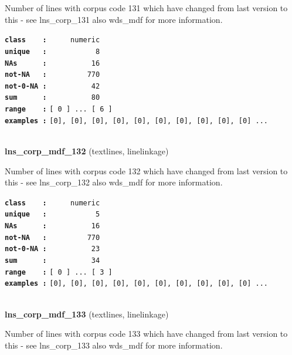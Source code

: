 \documentclass[]{article}
\begin{document}
Number of lines with corpus code 131 which have changed from last
version to this - see lns\_corp\_131 also wds\_mdf for more information.

\textbf{\texttt{class\ \ \ \ :}} \texttt{~~~~~numeric}\\
\textbf{\texttt{unique\ \ \ :}} \texttt{~~~~~~~~~~~8}\\
\textbf{\texttt{NAs\ \ \ \ \ \ :}} \texttt{~~~~~~~~~~16}\\
\textbf{\texttt{not-NA\ \ \ :}} \texttt{~~~~~~~~~770}\\
\textbf{\texttt{not-0-NA\ :}} \texttt{~~~~~~~~~~42}\\
\textbf{\texttt{sum\ \ \ \ \ \ :}} \texttt{~~~~~~~~~~80}\\
\textbf{\texttt{range\ \ \ \ :}}
\texttt{{[}\ 0\ {]}\ ...\ {[}\ 6\ {]}}\\
\textbf{\texttt{examples\ :}}
\texttt{{[}0{]},\ {[}0{]},\ {[}0{]},\ {[}0{]},\ {[}0{]},\ {[}0{]},\ {[}0{]},\ {[}0{]},\ {[}0{]},\ {[}0{]}\ ...}\\

~

\textbf{lns\_corp\_mdf\_132} (textlines, linelinkage)

Number of lines with corpus code 132 which have changed from last
version to this - see lns\_corp\_132 also wds\_mdf for more information.

\textbf{\texttt{class\ \ \ \ :}} \texttt{~~~~~numeric}\\
\textbf{\texttt{unique\ \ \ :}} \texttt{~~~~~~~~~~~5}\\
\textbf{\texttt{NAs\ \ \ \ \ \ :}} \texttt{~~~~~~~~~~16}\\
\textbf{\texttt{not-NA\ \ \ :}} \texttt{~~~~~~~~~770}\\
\textbf{\texttt{not-0-NA\ :}} \texttt{~~~~~~~~~~23}\\
\textbf{\texttt{sum\ \ \ \ \ \ :}} \texttt{~~~~~~~~~~34}\\
\textbf{\texttt{range\ \ \ \ :}}
\texttt{{[}\ 0\ {]}\ ...\ {[}\ 3\ {]}}\\
\textbf{\texttt{examples\ :}}
\texttt{{[}0{]},\ {[}0{]},\ {[}0{]},\ {[}0{]},\ {[}0{]},\ {[}0{]},\ {[}0{]},\ {[}0{]},\ {[}0{]},\ {[}0{]}\ ...}\\

~

\textbf{lns\_corp\_mdf\_133} (textlines, linelinkage)

Number of lines with corpus code 133 which have changed from last
version to this - see lns\_corp\_133 also wds\_mdf for more information.
\end{document}
